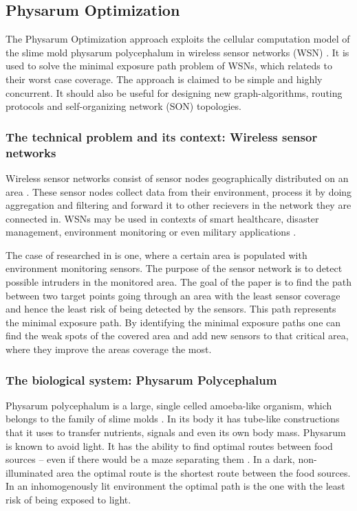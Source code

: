 \documentclass{IWORK2014}
\begin{document}
\subsection{Physarum Optimization}
The Physarum Optimization approach exploits the cellular computation model of the slime mold physarum polycephalum in wireless sensor networks (WSN) \cite{liu2012physarum}. It is used to solve the minimal exposure path problem of WSNs, which relateds to their worst case coverage. The approach is claimed to be simple and highly concurrent. It should also be useful for designing new graph-algorithms, routing protocols and self-organizing network (SON) topologies.

\subsubsection{The technical problem and its context: Wireless sensor networks}
Wireless sensor networks consist of sensor nodes geographically distributed on an area \cite{nazi2013robust}. These sensor nodes collect data from their environment, process it by doing aggregation and filtering and forward it to other recievers in the network they are connected in. WSNs may be used in contexts of smart healthcare, disaster management, environment monitoring \cite{nazi2013robust} or even military applications \cite{liu2012physarum}.

The case of researched in \cite{liu2012physarum} is one, where a certain area is populated with environment monitoring sensors. The purpose of the sensor network is to detect possible intruders in the monitored area. The goal of the paper is to find the path between two target points going through an area with the least sensor coverage and hence the least risk of being detected by the sensors. This path represents the minimal exposure path. By identifying the minimal exposure paths one can find the weak spots of the covered area and add new sensors to that critical area, where they improve the areas coverage the most.

\subsubsection{The biological system: Physarum Polycephalum}
Physarum polycephalum is a large, single celled amoeba-like organism, which belongs to the family of slime molds \cite{liu2012physarum}. In its body it has tube-like constructions that it uses to transfer nutrients, signals and even its own body mass. Physarum is known to avoid light. It has the ability to find optimal routes between food sources -- even if there would be a maze separating them \cite{nakagaki2000intelligence}. In a dark, non-illuminated area the optimal route is the shortest route between the food sources. In an inhomogenously lit environment the optimal path is the one with the least risk of being exposed to light.
\end{document}
